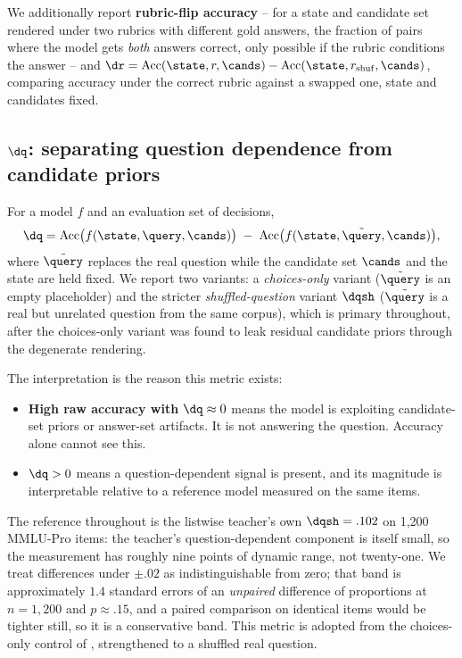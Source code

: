 We additionally report \textbf{rubric-flip accuracy} -- for a state and candidate set rendered under two
rubrics with different gold answers, the fraction of pairs where the model gets \emph{both} answers
correct, only possible if the rubric conditions the answer -- and
$\dr = \mathrm{Acc}(\state, r, \cands) - \mathrm{Acc}(\state, r_{\mathrm{shuf}}, \cands)$, comparing
accuracy under the correct rubric against a swapped one, state and candidates fixed.

\subsection{\texorpdfstring{$\dq$}{Delta-q}: separating question dependence from candidate priors}
\label{sec:experiments:deltaq}

\begin{definition}
\label{def:deltaq}
For a model $f$ and an evaluation set of decisions,
\[
  \dq = \mathrm{Acc}\big(f(\state, \query, \cands)\big) \;-\; \mathrm{Acc}\big(f(\state, \tilde{\query}, \cands)\big),
\]
where $\tilde{\query}$ replaces the real question while the candidate set $\cands$ and the state are held
fixed. We report two variants: a \emph{choices-only} variant ($\tilde{\query}$ is an empty placeholder)
and the stricter \emph{shuffled-question} variant $\dqsh$ ($\tilde{\query}$ is a real but unrelated
question from the same corpus), which is primary throughout, after the choices-only variant was found to
leak residual candidate priors through the degenerate rendering.
\end{definition}

The interpretation is the reason this metric exists:

\begin{itemize}
  \item \textbf{High raw accuracy with $\dq \approx 0$} means the model is exploiting candidate-set
  priors or answer-set artifacts. It is not answering the question. Accuracy alone cannot see this.
  \item \textbf{$\dq > 0$} means a question-dependent signal is present, and its magnitude is
  interpretable relative to a reference model measured on the same items.
\end{itemize}

The reference throughout is the listwise teacher's own $\dqsh = .102$ on 1{,}200 MMLU-Pro items: the
teacher's question-dependent component is itself small, so the measurement has roughly nine points of
dynamic range, not twenty-one. We treat differences under $\pm .02$ as indistinguishable from zero;
that band is approximately $1.4$ standard errors of an \emph{unpaired} difference of proportions at
$n{=}1{,}200$ and $p \approx .15$, and a paired comparison on identical items would be tighter still, so
it is a conservative band. This metric is adopted from the choices-only control of
\citet{balepur2024artifacts}, strengthened to a shuffled real question.

